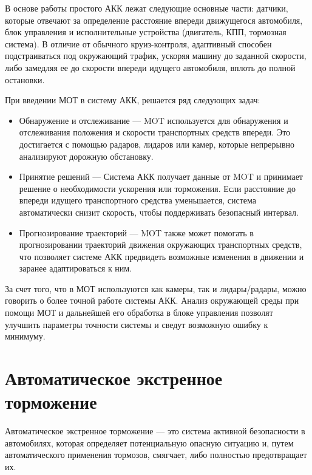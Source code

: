В основе работы простого АКК лежат следующие основные части: датчики, которые отвечают за определение расстояние впереди движущегося автомобиля, блок управления и исполнительные устройства (двигатель, КПП, тормозная система). В отличие от обычного круиз-контроля, адаптивный способен подстраиваться под окружающий трафик, ускоряя машину до заданной скорости, либо замедляя ее до скорости впереди идущего автомобиля, вплоть до полной остановки.

При введении МОТ в систему АКК, решается ряд следующих задач:

\begin{itemize}

	\item Обнаружение и отслеживание --- MOT используется для обнаружения и отслеживания положения и скорости транспортных средств впереди. Это достигается с помощью радаров, лидаров или камер, которые непрерывно анализируют дорожную обстановку.

	\item Принятие решений --- Система АКК получает данные от MOT и принимает решение о необходимости ускорения или торможения. Если расстояние до впереди идущего транспортного средства уменьшается, система автоматически снизит скорость, чтобы поддерживать безопасный интервал.

	\item Прогнозирование траекторий --- MOT также может помогать в прогнозировании траекторий движения окружающих транспортных средств, что позволяет системе АКК предвидеть возможные изменения в движении и заранее адаптироваться к ним.

\end{itemize}

За счет того, что в МОТ используются как камеры, так и лидары/радары, можно говорить о более точной работе системы АКК. Анализ окружающей среды при помощи МОТ и дальнейшей его обработка в блоке управления позволят улучшить параметры точности системы и сведут возможную ошибку к минимуму. 

\section{Автоматическое экстренное торможение}

Автоматическое экстренное торможение --- это система активной безопасности в автомобилях, которая определяет потенциальную опасную ситуацию и, путем автоматического применения тормозов, смягчает, либо полностью предотвращает их. 

